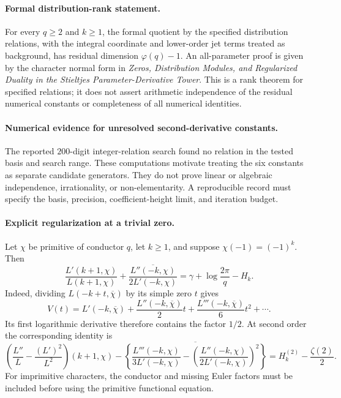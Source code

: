 
\paragraph{Formal distribution-rank statement.}
For every $q\geq2$ and $k\geq1$, the formal quotient by the specified
distribution relations, with the integral coordinate and lower-order jet
terms treated as background, has residual dimension $\varphi(q)-1$.
An all-parameter proof is given by the character normal form in
\emph{Zeros, Distribution Modules, and Regularized Duality in the Stieltjes
Parameter-Derivative Tower}. This is a rank theorem for specified relations;
it does not assert arithmetic independence of the residual numerical constants
or completeness of all numerical identities.

\paragraph{Numerical evidence for unresolved second-derivative constants.}
The reported $200$-digit integer-relation search found no relation in the
tested basis and search range. These computations motivate treating the six
constants as separate candidate generators. They do not prove linear or
algebraic independence, irrationality, or non-elementarity. A reproducible
record must specify the basis, precision, coefficient-height limit, and
iteration budget.

\paragraph{Explicit regularization at a trivial zero.}
Let $\chi$ be primitive of conductor $q$, let $k\geq1$, and suppose
$\chi(-1)=(-1)^k$. Then
\[
 \frac{L'(k+1,\chi)}{L(k+1,\chi)}
 +\overline{\frac{L''(-k,\chi)}{2L'(-k,\chi)}}
 =\gamma+\log\frac{2\pi}{q}-H_k.
\]
Indeed, dividing $L(-k+t,\overline\chi)$ by its simple zero $t$ gives
\[
 V(t)=L'(-k,\overline\chi)
      +\frac{L''(-k,\overline\chi)}{2}t
      +\frac{L'''(-k,\overline\chi)}{6}t^2+\cdots.
\]
Its first logarithmic derivative therefore contains the factor $1/2$.
At second order the corresponding identity is
\[
 \left(\frac{L''}{L}-\frac{(L')^2}{L^2}\right)(k+1,\chi)
 -\overline{\left\{
 \frac{L'''(-k,\chi)}{3L'(-k,\chi)}
 -\left(\frac{L''(-k,\chi)}{2L'(-k,\chi)}\right)^2\right\}}
 =H_k^{(2)}-\frac{\zeta(2)}2.
\]
For imprimitive characters, the conductor and missing Euler factors must be
included before using the primitive functional equation.

